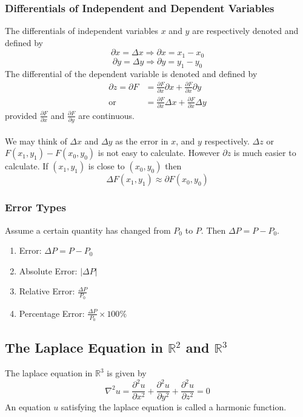 \documentclass[14pt]{article}
\begin{document}
    \subsubsection{Differentials of Independent and Dependent Variables}
    The differentials of independent variables $x$ and $y$ are respectively denoted and defined by
    $$\partial x=\Delta x\Rightarrow\partial x=x_1-x_0$$
    $$\partial y=\Delta y\Rightarrow\partial y=y_1-y_0$$
    The differential of the dependent variable is denoted and defined by
    \begin{align*}
        \partial z=\partial F &=\frac{\partial F}{\partial x}\partial x+\frac{\partial F}{\partial x}\partial y\\
        \text{or} &= \frac{\partial F}{\partial x}\Delta x+\frac{\partial F}{\partial x}\Delta y
    \end{align*}
    provided $\frac{\partial F}{\partial x}$ and $\frac{\partial F}{\partial y}$ are continuous.\\\\
    We may think of $\Delta x$ and $\Delta y$ as the error in $x$, and $y$ respectively. $\Delta z$ or $F(x_1, y_1)-F(x_0, y_0)$ is not easy to calculate. However $\partial z$ is much easier to calculate. If $(x_1,y_1)$ is close to $(x_0, y_0)$ then
    $$\Delta F(x_1, y_1)\approx \partial F(x_0, y_0)$$
    \subsubsection{Error Types}
    Assume a certain quantity has changed from $P_0$ to $P$. Then $\Delta P= P-P_0$.
    \begin{enumerate}
        \item Error: $\Delta P=P-P_0$
        \item Absolute Error: $|\Delta P|$
        \item Relative Error: $\frac{\Delta P}{P_0}$
        \item Percentage Error: $\frac{\Delta P}{P_0}\times 100\% $ 
    \end{enumerate}
    \subsection{The Laplace Equation in $\mathbb{R}^2$ and $\mathbb{R}^3$}
    The laplace equation in $\mathbb{R}^3$ is given by
    $$\nabla^2u=\frac{\partial^2u}{\partial x^2}+\frac{\partial^2 u}{\partial y^2}+\frac{\partial^2 u}{\partial z^2}=0$$
    An equation $u$ satisfying the laplace equation is called a harmonic function.
\end{document}

